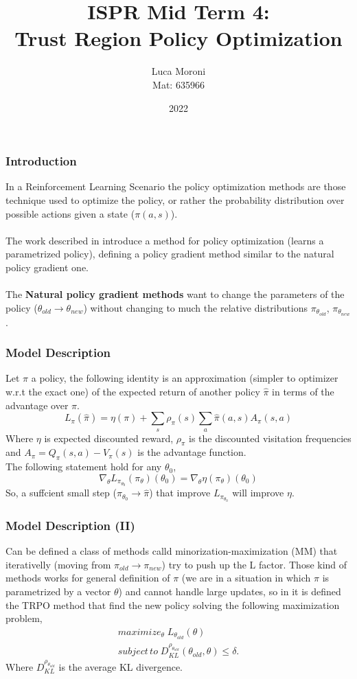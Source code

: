 \documentclass{beamer}
\title{ISPR Mid Term 4:\\Trust Region Policy Optimization}
\author{Luca Moroni\\Mat: 635966}
\institute{ISPR}
\date{2022}
\begin{document}
\frame{\titlepage}

\begin{frame}
\frametitle{Introduction}
In a Reinforcement Learning Scenario the policy optimization methods are those technique used to optimize the policy, or rather the probability distribution over possible actions given a state ($\pi(a, s)$).\\~\\
The work described in \cite{schulman2015trust} introduce a method for policy optimization (learns a parametrized policy), defining a policy gradient method similar to the natural policy gradient one.\\~\\
The \textbf{Natural policy gradient methods} want to change the parameters of the policy ($\theta_{old} \to \theta_{new}$) without changing to much the relative distributions $\pi_{\theta_{old}}$,  $\pi_{\theta_{new}}$.
\end{frame}

\begin{frame}
\frametitle{Model Description}
Let $\pi$ a policy, the following identity is an approximation (simpler to optimizer w.r.t the exact one) of the expected return of another policy $\hat{\pi}$ in terms of the advantage over $\pi$.\\
\[L_{\pi}(\hat{\pi}) = \eta(\pi) + \sum_s \rho_{\pi}(s) \sum_a \hat{\pi}(a,s) A_{\pi}(s,a)\]
Where $\eta$ is expected discounted reward, $\rho_{\pi}$ is the discounted visitation frequencies and $A_{\pi} = Q_{\pi}(s, a) - V_{\pi}(s)$ is the advantage function.\\
The following statement hold for any $\theta_0$,
\[\nabla_{\theta} L_{\pi_{\theta_0}} (\pi_{\theta}) (\theta_0) = \nabla_{\theta} \eta (\pi_{\theta}) (\theta_0)\]
So, a suffcient small step ($\pi_{\theta_0} \to \hat{\pi}$) that improve $L_{\pi_{\theta_{0}}}$ will improve $\eta$.
\end{frame}

\begin{frame}
\frametitle{Model Description (II)}
Can be defined a class of methods calld minorization-maximization (MM) that iterativelly (moving from $\pi_{old} \to \pi_{new}$) try to push up the L factor. Those kind of methods works for general definition of $\pi$ (we are in a situation in which $\pi$ is parametrized by a vector $\theta$) and cannot handle large updates, so in \cite{schulman2015trust} it is defined the TRPO method that find the new policy solving the following maximization problem,
\begin{gather*}
maximize_{\theta} \; L_{\theta_{old}}(\theta)\\
subject \, to \; D_{KL}^{\rho_{\theta_{old}}} (\theta_{old}, \theta) \leq \delta.
\end{gather*}
Where $D_{KL}^{\rho_{\theta_{old}}}$ is the average KL divergence.
\end{frame}
\end{document}
